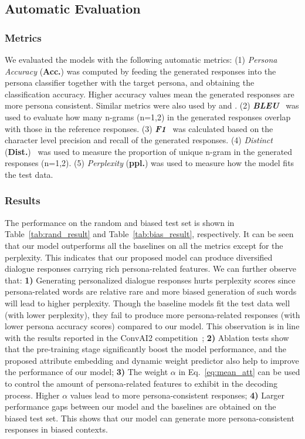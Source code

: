 \documentclass[letterpaper]{article}
\newcommand{\citet}[1]{\citeauthor{#1} \shortcite{#1}}
\newcommand{\citep}{\cite}
\begin{document}
\subsection{Automatic Evaluation}
\subsubsection{Metrics}
We evaluated the models with the following automatic metrics:
(1) \emph{Persona Accuracy} (\textbf{Acc.}) was computed by feeding the generated responses into the persona classifier together with the target persona, and obtaining the classification accuracy. Higher accuracy values mean the generated responses are more persona consistent. Similar metrics were also used by \citet{zheng2019Personal} and \citet{zhou2018emotional}.
(2) \emph{\textbf{BLEU}}~\citep{papineni-etal-2002-bleu} was used to evaluate how many n-grams (n=1,2) in the generated responses overlap with those in the reference responses.
(3) \emph{\textbf{F1}}~\citep{dinan2019convai2} was calculated based on the character level precision and recall of the generated responses.
(4) \emph{Distinct} (\textbf{Dist.})~\citep{li2015diversity} was used to measure the proportion of unique n-gram in the generated responses (n=1,2).
(5) \emph{Perplexity} (\textbf{ppl.}) was used to measure how the model fits the test data.

\subsubsection{Results}
The performance on the random and biased test set is shown in Table~\ref{tab:rand_result} and Table~\ref{tab:bias_result}, respectively. It can be seen that our model outperforms all the baselines on all the metrics except for the perplexity. This indicates that our proposed model can produce diversified dialogue responses carrying rich persona-related features. We can further observe that:
\textbf{1)} Generating personalized dialogue responses hurts perplexity scores since persona-related words are relative rare and more biased generation of such words will lead to higher perplexity. Though the baseline models fit the test data well (with lower perplexity), they fail to produce more persona-related responses (with lower persona accuracy scores) compared to our model. This observation is in line with the results reported in the ConvAI2 competition~\citep{dinan2019convai2};
\textbf{2)} Ablation tests show that the pre-training stage significantly boost the model performance, and the proposed attribute embedding and dynamic weight predictor also help to improve the performance of our model;
\textbf{3)} The weight $\alpha$ in Eq.~\ref{eq:mean_att} can be used to control the amount of persona-related features to exhibit in the decoding process. Higher $\alpha$ values lead to more persona-consistent responses;
\textbf{4)} Larger performance gaps between our model and the baselines are obtained on the biased test set. This shows that our model can generate more persona-consistent responses in biased contexts.
\end{document}
